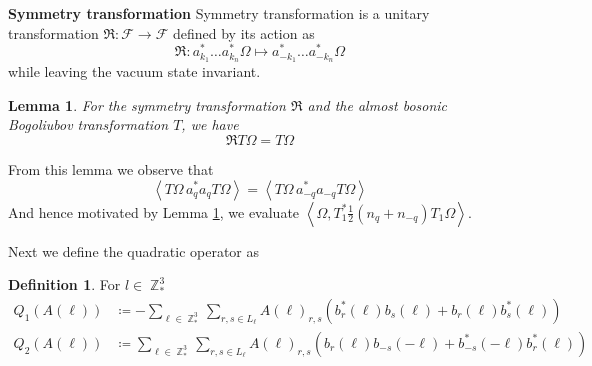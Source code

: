 \documentclass[sn-mathphys,Numbered, a4paper ,nocrop]{sn-jnl}%
\DeclareMathOperator{\Z}{\mathbb{Z}}
\newcommand{\half}{\frac{1}{2}}
\newcommand{\eva}[1]{\left\langle #1 \right\rangle}
\theoremstyle{plain}
\newtheorem{lemma}[theorem]{Lemma}
\theoremstyle{definition}
\newtheorem{definition}[theorem]{Definition}
\theoremstyle{remark}
\theoremstyle{plain}
\theoremstyle{definition}
\theoremstyle{remark}
\begin{document}
\textbf{Symmetry transformation} Symmetry transformation is a unitary transformation $\mathfrak{R}:\mathcal{F}\rightarrow \mathcal{F}$ defined by its action as
\begin{equation}
    \mathfrak{R}: a^*_{k_1}\ldots a^*_{k_n}\Omega \mapsto a^*_{-k_1}\ldots a^*_{-k_n}\Omega 
\end{equation}
while leaving the vacuum state invariant.

\begin{lemma}\label{lem:symtransformation}
    For the symmetry transformation $\mathfrak{R}$ and the almost bosonic Bogoliubov transformation $T$, we have
    \begin{equation}
        \mathfrak{R}T\Omega = T\Omega
    \end{equation}
\end{lemma}
From this lemma we observe that 
\begin{equation}
    \eva{T\Omega\, a^*_qa_qT\Omega} = \eva{T\Omega\, a^*_{-q}a_{-q}T\Omega}
\end{equation}
And hence motivated by Lemma \ref{lem:symtransformation}, we evaluate $\eva{\Omega, T_1^*\half\left(n_q+n_{-q}\right)T_1\Omega}$.\newline 

Next we define the quadratic operator as 
\begin{definition}
For $l \in \Z^3_*$
\begin{align} 
    Q_1(A(\ell))&\coloneq  -\sum\limits_{\ell \in \Z^3_*}\sum\limits_{r,s \in L_{\ell}}A(\ell)_{r,s} \left(b^*_r(\ell)b_{s}(\ell)+b_{r}(\ell)b^*_{s}(\ell)\right)\label{eq:Q1}\\ 
    Q_2(A(\ell))&\coloneq  \sum\limits_{\ell \in \Z^3_*}\sum\limits_{r,s \in L_{\ell}}A(\ell)_{r,s} \left(b_r(\ell)b_{-s}(-\ell)+b^*_{-s}(-\ell)b^*_{r}(\ell)\right)\label{eq:Q2}
\end{align}
    
\end{definition}
\end{document}
